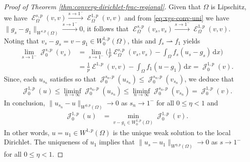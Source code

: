\documentclass[10pt,a4paper]{amsart}
\DeclareMathOperator{\cE}{\mathcal{E}}
\DeclareMathOperator{\cJ}{\mathcal{J}}
\renewcommand{\d}{\,\mathrm{d}}
\begin{document}
\begin{proof}[Proof of Theorem \ref{thm:converg-dirichlet-frac-regional}]
Given that $\Omega$ is Lipschitz, we have  $ \cE^{s,p}_\Omega(v,v)\xrightarrow{s\to1^-}\cE^{1,p}_\Omega(v,v)$  and from \eqref{eq:xgs-conv-uni} we have $\|g_s-g_1\|_{W^{s,p}(\Omega)}\xrightarrow{s\to1^-}0$, it follows that
$\cE^{s,p}_\Omega(v_s,v_s)
\xrightarrow{s\to 1^-} \cE^{1,p}_\Omega(v,v).$
Noting that $v_s-g_s= v-g_1\in W^{1,p}_0(\Omega)$, this and  $f_{s}\rightharpoonup f_1 $ yields
\begin{align*}
\lim_{s\to1^-}\cJ^{s,p}_0(v_s)
&= \lim_{s\to1^-}\big(\tfrac{1}{p}  \cE^{s,p}_\Omega(v_s, v_s)-\int_\Omega f_{s} (u_{s}-g_{s})\d x \big)\\
&=\tfrac{1}{p}\cE^{1,p}(v,v) -\int_\Omega f_1(u-g_{1})\d x= \cJ^{1,p}_0(v).
\end{align*}
Since, each $u_{s_n}$ satisfies
so that  $\cJ_0^{s_n,p}(u_{s_n})\leq
\cJ_0^{s_n,p}(v_{s_n}) $, we deduce that
\begin{align*}
\cJ^{1,p}_0(u)\leq \liminf_{n\to\infty}\cJ_0^{s_n,p}(u_{s_n})\leq
\liminf_{n\to\infty}\cJ_0^{s_n,p}(v_{s_n})= \cJ^{1,p}_0(v).
\end{align*}
In conclusion, $\|u_{s_n}-u\|_{W^{\eta,p}(\Omega)}\to 0$ as $s_n\to1^-$ for all $0\leq \eta<1$ and
\begin{align*}
\cJ^{1,p}_0(u)&= \min_{v-g_1\in W^{1,p}_0(\Omega)} \cJ^{1,p}_0(v).
\end{align*}
In other words, $u= u_1\in W^{1,p}(\Omega)$ is the unique weak solution to the local  Dirichlet. The uniqueness of $u_1$ implies  that $\|u_{s}-u_1\|_{W^{\eta,p}(\Omega)}\to 0$ as $s\to1^-$ for all $0\leq \eta<1$.
\end{proof}
\end{document}
